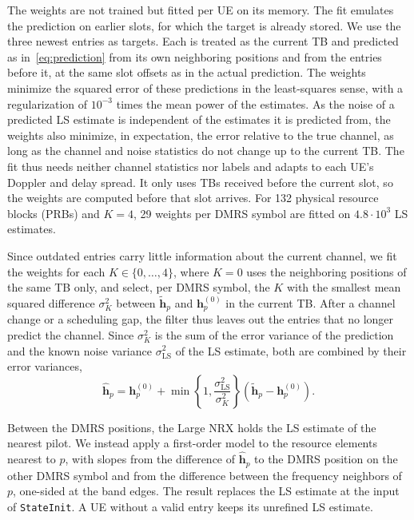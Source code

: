 The weights are not trained but fitted per UE on its memory. The fit emulates the prediction on earlier slots, for which the target is already stored. We use the three newest entries as targets. Each is treated as the current TB and predicted as in~\eqref{eq:prediction} from its own neighboring positions and from the entries before it, at the same slot offsets as in the actual prediction. The weights minimize the squared error of these predictions in the least-squares sense, with a regularization of $10^{-3}$ times the mean power of the estimates. As the noise of a predicted LS estimate is independent of the estimates it is predicted from, the weights also minimize, in expectation, the error relative to the true channel, as long as the channel and noise statistics do not change up to the current TB. The fit thus needs neither channel statistics nor labels and adapts to each UE's Doppler and delay spread. It only uses TBs received before the current slot, so the weights are computed before that slot arrives. For 132 physical resource blocks (PRBs) and $K=4$, 29 weights per DMRS symbol are fitted on $4.8\cdot 10^{3}$ LS estimates.

Since outdated entries carry little information about the current channel, we fit the weights for each $K\in\{0,\dots,4\}$, where $K=0$ uses the neighboring positions of the same TB only, and select, per DMRS symbol, the $K$ with the smallest mean squared difference $\sigma_{K}^{2}$ between $\tilde{\mathbf{h}}_{p}$ and $\mathbf{h}^{(0)}_{p}$ in the current TB. After a channel change or a scheduling gap, the filter thus leaves out the entries that no longer predict the channel. Since $\sigma_{K}^{2}$ is the sum of the error variance of the prediction and the known noise variance $\sigma_{\mathrm{LS}}^{2}$ of the LS estimate, both are combined by their error variances,
\begin{equation}
\hat{\mathbf{h}}_{p}=\mathbf{h}^{(0)}_{p}+\min\!\left\{1,\frac{\sigma_{\mathrm{LS}}^{2}}{\sigma_{K}^{2}}\right\}\left(\tilde{\mathbf{h}}_{p}-\mathbf{h}^{(0)}_{p}\right).
\end{equation}

Between the DMRS positions, the Large NRX holds the LS estimate of the nearest pilot. We instead apply a first-order model to the resource elements nearest to $p$, with slopes from the difference of $\hat{\mathbf{h}}_{p}$ to the DMRS position on the other DMRS symbol and from the difference between the frequency neighbors of $p$, one-sided at the band edges. The result replaces the LS estimate at the input of \texttt{StateInit}. A UE without a valid entry keeps its unrefined LS estimate.

